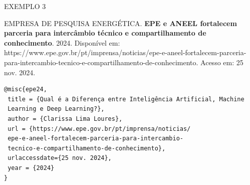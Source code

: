 EXEMPLO 3

EMPRESA DE PESQUISA ENERGÉTICA. \textbf{EPE e ANEEL fortalecem parceria para intercâmbio técnico e compartilhamento de conhecimento}. 2024. Disponível em: https://www.epe.gov.br/pt/imprensa/noticias/epe-e-aneel-fortalecem-parceria-para-intercambio-tecnico-e-compartilhamento-de-conhecimento. Acesso em: 25 nov. 2024.

\begin{verbatim}
@misc{epe24,
 title = {Qual é a Diferença entre Inteligência Artificial, Machine
 Learning e Deep Learning?},
 author = {Clarissa Lima Loures},
 url = {https://www.epe.gov.br/pt/imprensa/noticias/
 epe-e-aneel-fortalecem-parceria-para-intercambio-
 tecnico-e-compartilhamento-de-conhecimento},
 urlaccessdate={25 nov. 2024},
 year = {2024}
}
\end{verbatim}

